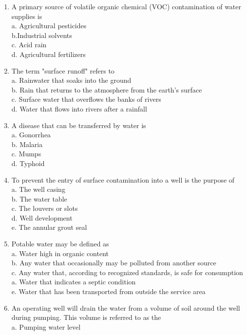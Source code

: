 \begin{enumerate}
\item A primary source of volatile organic chemical (VOC) contamination of water supplies is\\
a. Agricultural pesticides\\
b.Industrial solvents\\
c. Acid rain\\
d. Agricultural fertilizers\\
\item The term "surface runoff" refers to\\
a. Rainwater that soaks into the ground\\
b. Rain that returns to the atmosphere from the earth's surface\\
c. Surface water that overflows the banks of rivers\\
d. Water that flows into rivers after a rainfall\\
\item A disease that can be transferred by water is\\
a. Gonorrhea\\
b. Malaria\\
c. Mumps\\
d. Typhoid\\
\item To prevent the entry of surface contamination into a well is the purpose of\\
a. The well casing\\
b. The water table\\
c. The louvers or slots\\
d. Well development\\
e. The annular grout seal\\
\item Potable water may be defined as\\
a. Water high in organic content\\
b. Any water that occasionally may be polluted from another source\\
c. Any water that, according to recognized standards, is safe for consumption\\
a. Water that indicates a septic condition\\
e. Water that has been transported from outside the service area\\
\item An operating well will drain the water from a volume of soil around the well during pumping. This volume is referred to as the\\
a. Pumping water level\\

\end{enumerate}
